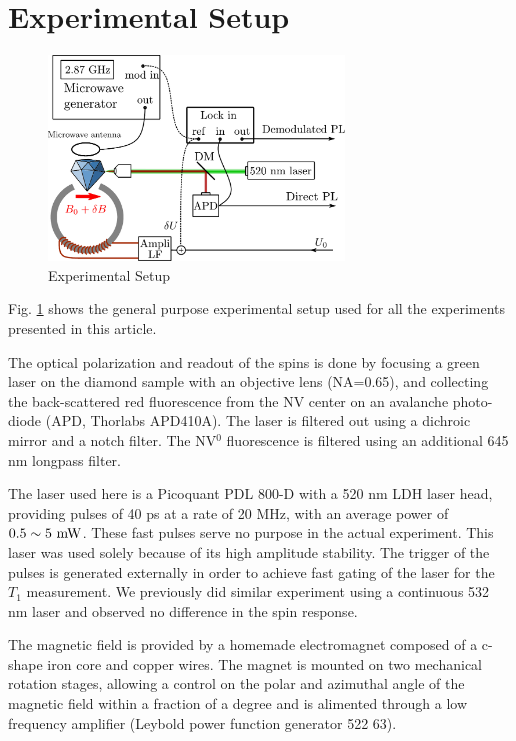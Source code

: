 \documentclass[preprintnumbers,amsmath,amssymb,onecolumn,12pt]{revtex4-2}\usepackage{graphicx}%
\begin{document}
\section{Experimental Setup}
\begin{figure}[h]
\includegraphics[width=0.7\textwidth]{Figures_SI/shema_exp}
\caption{Experimental Setup}
\label{setup}
\end{figure}
Fig. \ref{setup} shows the general purpose experimental setup used for all the experiments presented in this article.

The optical polarization and readout of the spins is done by focusing a green laser on the diamond sample with an objective lens (NA=0.65), and collecting the back-scattered red fluorescence from the NV center on an avalanche photo-diode (APD, Thorlabs APD410A). The laser is filtered out using a dichroic mirror and a notch filter. The NV$^0$ fluorescence is filtered using an additional 645 nm longpass filter.

The laser used here is a Picoquant PDL 800-D with a 520 nm LDH laser head, providing pulses of 40 ps at a rate of 20 MHz, with an average power of $0.5 \sim 5\ \rm mW$. These fast pulses serve no purpose in the actual experiment. This laser was used solely because of its high amplitude stability. The trigger of the pulses is generated externally in order to achieve fast gating of the laser for the $T_1$ measurement. We previously did similar experiment using a continuous 532 nm laser and observed no difference in the spin response. 

The magnetic field is provided by a homemade electromagnet composed of a c-shape iron core and  copper wires. The magnet is mounted on two mechanical rotation stages, allowing a control on the polar and azimuthal angle of the magnetic field within a fraction of a degree and is alimented through a low frequency amplifier (Leybold power function generator 522 63).
\end{document}
